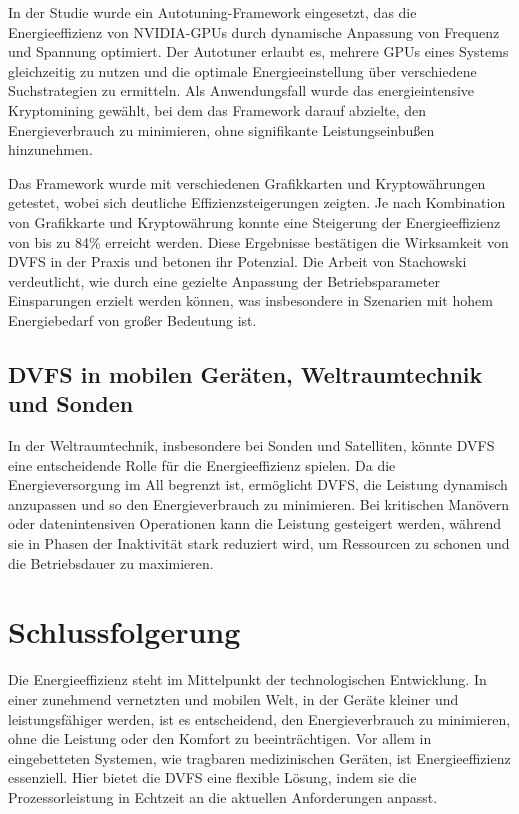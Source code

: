 \documentclass[footmark=none]{tubaf-thesis}
\begin{document}
        	In der Studie wurde ein Autotuning-Framework eingesetzt, das die Energieeffizienz von NVIDIA-GPUs durch dynamische Anpassung von Frequenz und Spannung optimiert. Der Autotuner erlaubt es, mehrere GPUs eines Systems gleichzeitig zu nutzen und die optimale Energieeinstellung über verschiedene Suchstrategien zu ermitteln. Als Anwendungsfall wurde das energieintensive Kryptomining gewählt, bei dem das Framework darauf abzielte, den Energieverbrauch zu minimieren, ohne signifikante Leistungseinbußen hinzunehmen.
        	
        	Das Framework wurde mit verschiedenen Grafikkarten und Kryptowährungen getestet, wobei sich deutliche Effizienzsteigerungen zeigten. Je nach Kombination von Grafikkarte und Kryptowährung konnte eine Steigerung der Energieeffizienz von bis zu 84\% erreicht werden. Diese Ergebnisse bestätigen die Wirksamkeit von DVFS in der Praxis und betonen ihr Potenzial. Die Arbeit von Stachowski verdeutlicht, wie durch eine gezielte Anpassung der Betriebsparameter Einsparungen erzielt werden können, was insbesondere in Szenarien mit hohem Energiebedarf von großer Bedeutung ist.
         
        \section{DVFS in mobilen Geräten, Weltraumtechnik und Sonden}
        	In der Weltraumtechnik, insbesondere bei Sonden und Satelliten, könnte DVFS eine entscheidende Rolle für die Energieeffizienz spielen. Da die Energieversorgung im All begrenzt ist, ermöglicht DVFS, die Leistung dynamisch anzupassen und so den Energieverbrauch zu minimieren. Bei kritischen Manövern oder datenintensiven Operationen kann die Leistung gesteigert werden, während sie in Phasen der Inaktivität stark reduziert wird, um Ressourcen zu schonen und die Betriebsdauer zu maximieren.
        
        
        
	\chapter{Schlussfolgerung}
        
       	Die Energieeffizienz steht im Mittelpunkt der technologischen Entwicklung. In einer zunehmend vernetzten und mobilen Welt, in der Geräte kleiner und leistungsfähiger werden, ist es entscheidend, den Energieverbrauch zu minimieren, ohne die Leistung oder den Komfort zu beeinträchtigen. Vor allem in eingebetteten Systemen, wie tragbaren medizinischen Geräten, ist Energieeffizienz essenziell. Hier bietet die DVFS eine flexible Lösung, indem sie die Prozessorleistung in Echtzeit an die aktuellen Anforderungen anpasst.
    		
\end{document}

